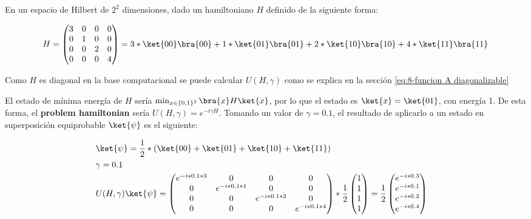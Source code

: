 En un espacio de Hilbert de $2^2$ dimensiones, dado un hamiltoniano $H$ definido de la siguiente forma:

\begin{align*}
  H = \begin{pmatrix}
    3 & 0 & 0 & 0 \\
    0 & 1 & 0 & 0 \\
    0 & 0 & 2 & 0 \\
    0 & 0 & 0 & 4
  \end{pmatrix} = 3*\ket{00}\bra{00} + 1*\ket{01}\bra{01} + 2*\ket{10}\bra{10} + 4*\ket{11}\bra{11}
\end{align*}

Como $H$ es diagonal en la base computacional se puede calcular $U(H, \gamma)$ como se explica en la sección \ref{eq:8-funcion A diagonalizable}

El estado de mínima energía de $H$ sería $\min_{x \in \{0, 1\}^2}{\bra{x}H\ket{x}}$, por lo que el estado es $\ket{x} = \ket{01}$, con energía 1.
De esta forma, el \textbf{problem hamiltonian} sería $U(H, \gamma) = e^{-i \gamma H}$. Tomando un valor de $\gamma = 0.1$, el resultado de aplicarlo a un estado en superposición equiprobable $\ket{\psi}$ es el siguiente:

\begin{align*}
  &\ket{\psi} = \frac{1}{2}*(\ket{00} + \ket{01} + \ket{10} + \ket{11}) &&\\
  &\gamma = 0.1 \\
  &U(H, \gamma) \ket{\psi} =
    \begin{pmatrix}
      e^{-i * 0.1 * 3} & 0                & 0                & 0 \\
      0                & e^{-i * 0.1 * 1} & 0                & 0 \\
      0                & 0                & e^{-i * 0.1 * 2} & 0 \\
      0                & 0                & 0                & e^{-i * 0.1 * 4}
    \end{pmatrix}
    *\frac{1}{2}
    \begin{pmatrix}
      1 \\
      1 \\
      1 \\
      1
    \end{pmatrix} = \frac{1}{2}
    \begin{pmatrix}
      e^{-i * 0.3} \\
      e^{-i * 0.1} \\
      e^{-i * 0.2} \\
      e^{-i * 0.4}
    \end{pmatrix}
\end{align*}

